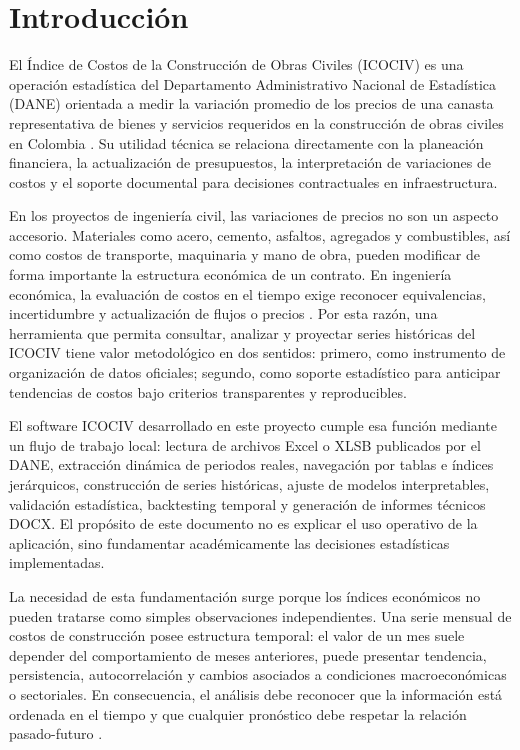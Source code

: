 \section{Introducción}

El Índice de Costos de la Construcción de Obras Civiles (ICOCIV) es una operación estadística del Departamento Administrativo Nacional de Estadística (DANE) orientada a medir la variación promedio de los precios de una canasta representativa de bienes y servicios requeridos en la construcción de obras civiles en Colombia \parencite{dane_icociv_web,dane_ficha_icociv}. Su utilidad técnica se relaciona directamente con la planeación financiera, la actualización de presupuestos, la interpretación de variaciones de costos y el soporte documental para decisiones contractuales en infraestructura.

En los proyectos de ingeniería civil, las variaciones de precios no son un aspecto accesorio. Materiales como acero, cemento, asfaltos, agregados y combustibles, así como costos de transporte, maquinaria y mano de obra, pueden modificar de forma importante la estructura económica de un contrato. En ingeniería económica, la evaluación de costos en el tiempo exige reconocer equivalencias, incertidumbre y actualización de flujos o precios \parencite{mcgraw_dieter_tvm_2021}. Por esta razón, una herramienta que permita consultar, analizar y proyectar series históricas del ICOCIV tiene valor metodológico en dos sentidos: primero, como instrumento de organización de datos oficiales; segundo, como soporte estadístico para anticipar tendencias de costos bajo criterios transparentes y reproducibles.

El software ICOCIV desarrollado en este proyecto cumple esa función mediante un flujo de trabajo local: lectura de archivos Excel o XLSB publicados por el DANE, extracción dinámica de periodos reales, navegación por tablas e índices jerárquicos, construcción de series históricas, ajuste de modelos interpretables, validación estadística, backtesting temporal y generación de informes técnicos DOCX. El propósito de este documento no es explicar el uso operativo de la aplicación, sino fundamentar académicamente las decisiones estadísticas implementadas.

La necesidad de esta fundamentación surge porque los índices económicos no pueden tratarse como simples observaciones independientes. Una serie mensual de costos de construcción posee estructura temporal: el valor de un mes suele depender del comportamiento de meses anteriores, puede presentar tendencia, persistencia, autocorrelación y cambios asociados a condiciones macroeconómicas o sectoriales. En consecuencia, el análisis debe reconocer que la información está ordenada en el tiempo y que cualquier pronóstico debe respetar la relación pasado-futuro \parencite{hyndman2021fpp3}.

